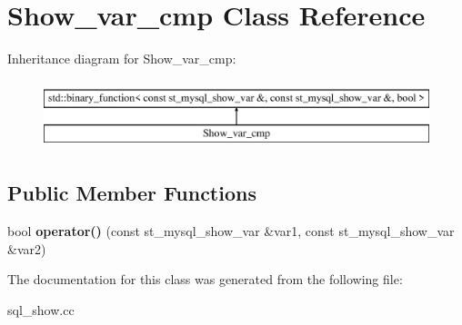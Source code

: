 \hypertarget{classShow__var__cmp}{}\section{Show\+\_\+var\+\_\+cmp Class Reference}
\label{classShow__var__cmp}
Inheritance diagram for Show\+\_\+var\+\_\+cmp\+:\begin{figure}[H]
\begin{center}
\leavevmode
\includegraphics[height=2.000000cm]{classShow__var__cmp}
\end{center}
\end{figure}
\subsection*{Public Member Functions}
\begin{DoxyCompactItemize}
\item 
\mbox{\label{classShow__var__cmp_a08a4470f91a3e20dd8f73225e0dba2d7}} 
bool {\bfseries operator()} (const st\+\_\+mysql\+\_\+show\+\_\+var \&var1, const st\+\_\+mysql\+\_\+show\+\_\+var \&var2)
\end{DoxyCompactItemize}


The documentation for this class was generated from the following file\+:\begin{DoxyCompactItemize}
\item 
sql\+\_\+show.\+cc\end{DoxyCompactItemize}
